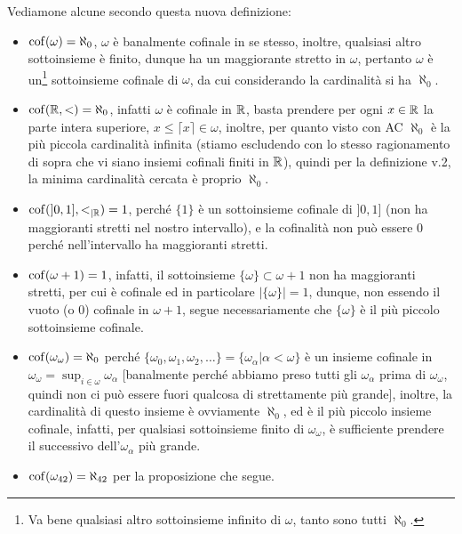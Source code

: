 \begin{example}
	Vediamone alcune secondo questa nuova definizione:
	\begin{itemize}
		\item $\operatorname{cof}(\omega) = \aleph_0$, $\omega$ è banalmente cofinale in se stesso, inoltre, qualsiasi altro sottoinsieme è finito, dunque ha un maggiorante stretto in $\omega$, pertanto $\omega$ è un\footnote{Va bene qualsiasi altro sottoinsieme infinito di $\omega$, tanto sono tutti $\aleph_0$.} sottoinsieme
		cofinale di $\omega$, da cui considerando la cardinalità si ha $\aleph_0$.
		\item $\operatorname{cof}(\mathbb R,<) = \aleph_0$, infatti $\omega$ è cofinale in $\mathbb R$, basta prendere per ogni $x \in \mathbb R$ la parte intera superiore, $x \leq \lceil x \rceil \in \omega$, inoltre, per quanto visto con AC $\aleph_0$ è la più
		piccola cardinalità infinita (stiamo escludendo con lo stesso ragionamento di sopra che vi siano insiemi cofinali finiti in $\mathbb R$), quindi per la definizione v.2, la minima cardinalità cercata è proprio $\aleph_0$.
		\item $\operatorname{cof}(]0,1],<_{|\mathbb R}) = 1$, perché $\{1\}$ è un sottoinsieme cofinale di $]0,1]$ (non ha maggioranti stretti nel nostro intervallo), e la cofinalità non può essere 0 perché nell'intervallo ha maggioranti stretti.
		\item $\operatorname{cof}(\omega+1) = 1$, infatti, il sottoinsieme $\{\omega\} \subset \omega + 1$ non ha maggioranti stretti, per cui è cofinale ed in particolare $|\{\omega\}| = 1$, dunque, non essendo il vuoto (o 0) cofinale in $\omega + 1$, segue necessariamente che $\{\omega\}$ è il più piccolo sottoinsieme cofinale.
		\item $\operatorname{cof}(\omega_\omega) = \aleph_0$ perché $\{\omega_0,\omega_1,\omega_2,\ldots\} = \{\omega_\alpha | \alpha < \omega\}$ è un insieme cofinale in $\omega_\omega = \sup_{i \in \omega} \omega_\alpha$ [banalmente perché abbiamo preso tutti gli $\omega_\alpha$ prima di $\omega_\omega$, quindi non ci può essere fuori qualcosa di strettamente più grande], inoltre, la cardinalità di questo insieme è ovviamente $\aleph_0$,
		ed è il più piccolo insieme cofinale, infatti, per qualsiasi sottoinsieme finito di $\omega_\omega$, è sufficiente prendere il successivo dell'$\omega_\alpha$ più grande.
		\item $\operatorname{cof}(\omega_{42}) = \aleph_{42}$ per la proposizione che segue.
	\end{itemize}
\end{example}

